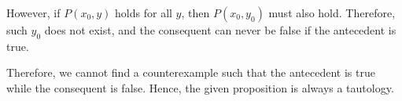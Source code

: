 \documentclass[answers]{exam}
\begin{document}
\begin{questions}
\begin{parts}
\begin{solution}
            However, if $P(x_0, y)$ holds for all $y$, then $P(x_0, y_0)$ must also hold.
            Therefore, such $y_0$ does not exist, and the consequent can never be false if
            the antecedent is true.

            Therefore, we cannot find a counterexample such that the antecedent is true
            while the consequent is false. Hence, the given proposition is always a tautology.
        \end{solution}

    \end{parts}

\end{questions}
\end{document}
